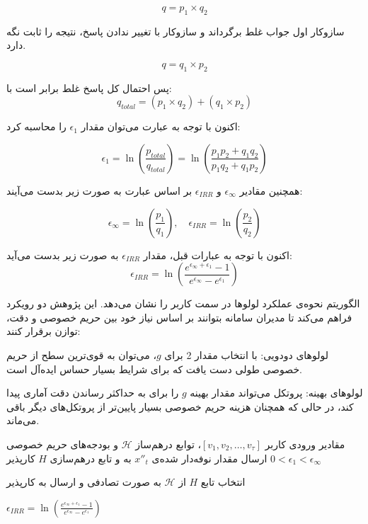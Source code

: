 $$q = p_1 \times q_2$$

 سازوکار اول جواب غلط برگرداند و سازوکار با تغییر ندادن پاسخ، نتیجه را ثابت نگه دارد.

$$q = q_1 \times p_2$$

پس احتمال کل پاسخ غلط برابر است با:
$$q_{total} = (p_1 \times q_2) + (q_1 \times p_2)$$

اکنون با توجه به عبارت  می‌توان مقدار $\epsilon_1$ را محاسبه کرد:

$$\epsilon_1 = \ln \left( \frac{p_{total}}{q_{total}} \right) = \ln \left( \frac{p_1 p_2 + q_1 q_2}{p_1 q_2 + q_1 p_2} \right)$$

همچنین مقادیر $\epsilon_\infty$ و $\epsilon_{IRR}$ بر اساس عبارت  به صورت زیر بدست می‌آیند:

$$\epsilon_\infty = \ln \left( \frac{p_1}{q_1} \right), \quad \epsilon_{IRR} = \ln \left( \frac{p_2}{q_2} \right)$$

اکنون با توجه به عبارات قبل، مقدار $\epsilon_{IRR}$ به صورت زیر بدست می‌آید:
$$\epsilon_{IRR} = \ln \left( \frac{e^{\epsilon_{\infty}+\epsilon_1} - 1}{e^{\epsilon_{\infty}} - e^{\epsilon_1}} \right)$$

الگوریتم  نحوه‌ی عملکرد لولوها در سمت کاربر را نشان می‌دهد. این پژوهش دو رویکرد فراهم می‌کند تا مدیران سامانه بتوانند بر اساس نیاز خود بین حریم خصوصی و دقت، توازن برقرار کنند:


 لولوهای دودویی: با انتخاب مقدار 2 برای $g$، می‌توان به قوی‌ترین سطح از حریم خصوصی طولی دست یافت که برای شرایط بسیار حساس ایده‌آل است.

 لولوهای بهینه: پروتکل می‌تواند مقدار بهینه $g$ را برای به حداکثر رساندن دقت آماری پیدا کند، در حالی که همچنان هزینه حریم خصوصی بسیار پایین‌تر از پروتکل‌های دیگر باقی می‌ماند.


 مقادیر ورودی کاربر $[v_1, v_2, \ldots, v_\tau]$، توابع درهم‌ساز $\mathcal{H}$ و بودجه‌های حریم خصوصی $0 < \epsilon_1 < \epsilon_\infty$ 
 ارسال مقدار نوفه‌دار شده‌ی $x''_t$ به و تابع درهم‌سازی $H$ کارپذیر

 انتخاب تابع $H$ از $\mathcal{H}$ به صورت تصادفی و ارسال به کارپذیر

 $\epsilon_{IRR} = \ln \left( \frac{e^{\epsilon_{\infty}+\epsilon_1} - 1}{e^{\epsilon_{\infty}} - e^{\epsilon_1}} \right)$

